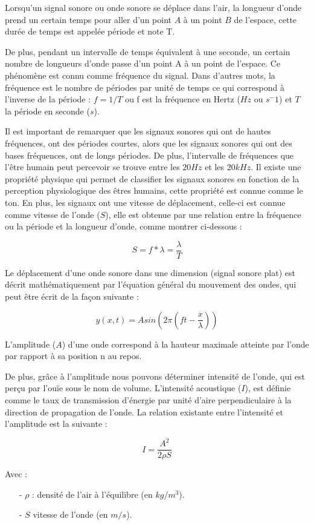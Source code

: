 \documentclass[conference,onecolumn]{IEEEtran}
\begin{document}
Lorsqu’un signal sonore ou onde sonore se déplace dans l’air, la longueur d’onde prend un certain temps pour aller d’un point $A$ à un point $B$ de l’espace, cette durée de temps est appelée période et note T. 

De plus, pendant un intervalle de temps équivalent à une seconde, un certain nombre de longueurs d’onde passe d’un point A à un point de l’espace. Ce phénomène est connu comme fréquence du signal. Dans d’autres mots, la fréquence est le nombre de périodes par unité de temps ce qui correspond à l’inverse de la période : $f=1/T$ ou f est la fréquence en Hertz ($Hz$ ou $s^-1$) et $T$ la période en seconde ($s$). 

Il est important de remarquer que les signaux sonores qui ont de hautes fréquences, ont des périodes courtes, alors que les signaux sonores qui ont des bases fréquences, ont de longs périodes. De plus, l’intervalle de fréquences que l’être humain peut percevoir se trouve entre les $20Hz$ et les $20 kHz$. Il existe une propriété physique qui permet de classifier les signaux sonores en fonction de la perception physiologique des êtres humains, cette propriété est connue comme le ton. En plus, les signaux ont une vitesse de déplacement, celle-ci est connue comme vitesse de l’onde ($S$), elle est obtenue par une relation entre la fréquence ou la période et la longueur d’onde, comme montrer ci-dessous : 

\[S = f*\lambda = \dfrac{\lambda}{T}\]

Le déplacement d’une onde sonore dans une dimension (signal sonore plat) est décrit mathématiquement par l’équation général du mouvement des ondes, qui peut être écrit de la façon suivante :  
 
\[y(x,t) = Asin(2\pi(ft - \dfrac{x}{\lambda}))\]

L'amplitude ($A$) d'une onde correspond à la hauteur maximale atteinte par l'onde par rapport à sa position n au repos. 

De plus, grâce à l’amplitude nous pouvons déterminer intensité de l’onde, qui est perçu par l’ouïe sous le nom de volume. L'intensité acoustique ($I$), est définie comme le taux de transmission d'énergie par unité d’aire perpendiculaire à la direction de propagation de l’onde. La relation existante entre l’intensité et l’amplitude est la suivante : 

\[I = \dfrac{A^2}{2\rho S}\]

Avec :

\begin{itemize} %

    \item[-] $\rho$ : densité de l’air à l’équilibre (en $kg/m^3$).
    \item[-] $S$ vitesse de l’onde (en $m/s$).

\end{itemize}
\end{document}
